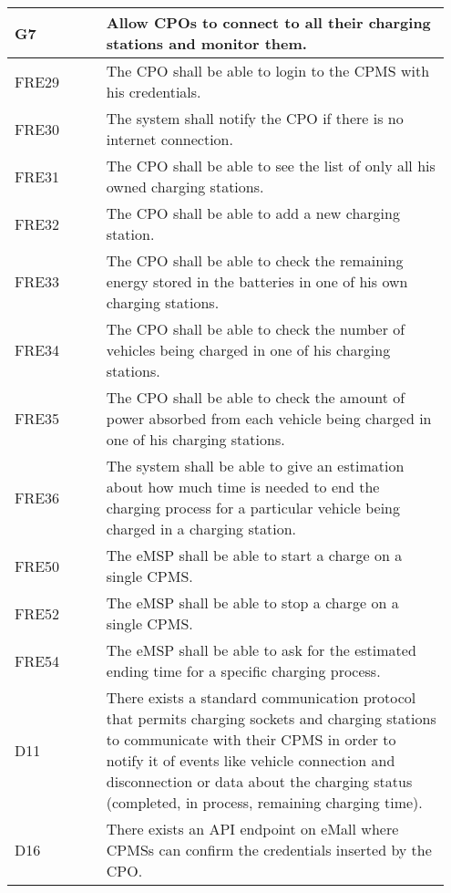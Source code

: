 \begin{longtable}{|p{0.20\linewidth}p{0.75\linewidth}|}
    \hline
    \rowcolor{bluepoli!40}\textbf{G7} & \textbf{Allow CPOs to connect to all their charging stations and monitor them.} \\
    \hline
    \rowcolor{bluepoli!15} FRE29 & The CPO shall be able to login to the CPMS with his credentials.\\
    \hline
    \rowcolor{bluepoli!15} FRE30 &  The system shall notify the CPO if there is no internet connection.\\
    \hline
    \rowcolor{bluepoli!15} FRE31 & The CPO shall be able to see the list of only all his owned charging stations.\\
    \hline
    \rowcolor{bluepoli!15} FRE32& The CPO shall be able to add a new charging station.\\
    \hline
    \rowcolor{bluepoli!15} FRE33 & The CPO shall be able to check the remaining energy stored in the batteries in one of his own charging stations.\\
    \hline
    \rowcolor{bluepoli!15} FRE34& The CPO shall be able to check the number of vehicles being charged in one of his charging stations.\\
    \hline
    \rowcolor{bluepoli!15} FRE35& The CPO shall be able to check the amount of power absorbed from each vehicle being charged in one of his charging stations.\\
    \hline
    \rowcolor{bluepoli!15} FRE36& The system shall be able to give an estimation about how much time is needed to end the charging process for a particular vehicle being charged in a charging station.\\
    \hline
    \rowcolor{bluepoli!15} FRE50 & The eMSP shall be able to start a charge on a single CPMS.\\
    \hline
    \rowcolor{bluepoli!15} FRE52 & The eMSP shall be able to stop a charge on a single CPMS.\\
    \hline
    \rowcolor{bluepoli!15} FRE54& The eMSP shall be able to ask for the estimated ending time for a specific charging process.\\
    \hline
    \rowcolor{bluepoli!5} D11 & There exists a standard communication protocol that permits charging sockets and charging stations to communicate with their CPMS in order to notify it of events like vehicle connection and disconnection or data about the charging status (completed, in process, remaining charging time).\\
    \hline 
    \rowcolor{bluepoli!5} D16& There exists an API endpoint on eMall where CPMSs can confirm the credentials inserted by the CPO.\\
    \hline
\end{longtable}
